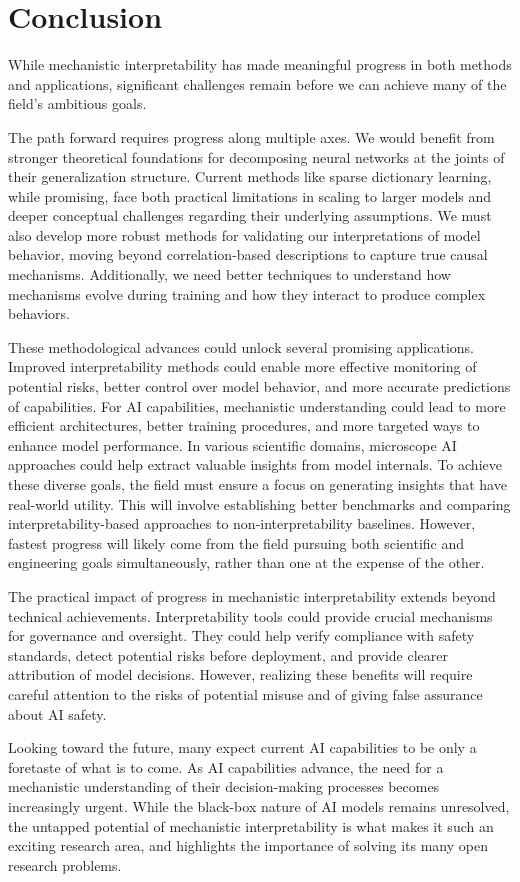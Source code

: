 \section{Conclusion}
\label{sec:conclusion}

While mechanistic interpretability has made meaningful progress in both methods and applications, significant challenges remain before we can achieve many of the field's ambitious goals.

The path forward requires progress along multiple axes. We would benefit from stronger theoretical foundations for decomposing neural networks at the joints of their generalization structure. Current methods like sparse dictionary learning, while promising, face both practical limitations in scaling to larger models and deeper conceptual challenges regarding their underlying assumptions. We must also develop more robust methods for validating our interpretations of model behavior, moving beyond correlation-based descriptions to capture true causal mechanisms. Additionally, we need better techniques to understand how mechanisms evolve during training and how they interact to produce complex behaviors.

These methodological advances could unlock several promising applications. Improved interpretability methods could enable more effective monitoring of potential risks, better control over model behavior, and more accurate predictions of capabilities. For AI capabilities, mechanistic understanding could lead to more efficient architectures, better training procedures, and more targeted ways to enhance model performance. In various scientific domains, microscope AI approaches could help extract valuable insights from model internals. To achieve these diverse goals, the field must ensure a focus on generating insights that have real-world utility. This will involve establishing better benchmarks and comparing interpretability-based approaches to non-interpretability baselines. However, fastest progress will likely come from the field pursuing both scientific and engineering goals simultaneously, rather than one at the expense of the other.

The practical impact of progress in mechanistic interpretability extends beyond technical achievements. Interpretability tools could provide crucial mechanisms for governance and oversight. They could help verify compliance with safety standards, detect potential risks before deployment, and provide clearer attribution of model decisions. However, realizing these benefits will require careful attention to the risks of potential misuse and of giving false assurance about AI safety.

Looking toward the future, many expect current AI capabilities to be only a foretaste of what is to come. As AI capabilities advance, the need for a mechanistic understanding of their decision-making processes becomes increasingly urgent. While the black-box nature of AI models remains unresolved, the untapped potential of mechanistic interpretability is what makes it such an exciting research area, and highlights the importance of solving its many open research problems.
